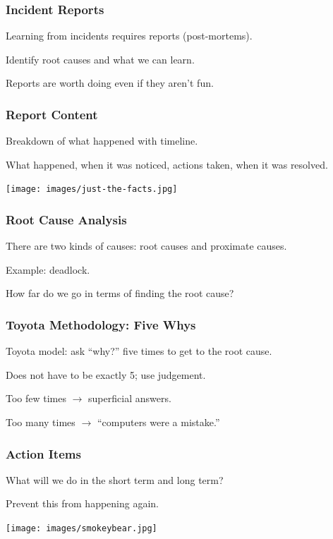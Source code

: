 \begin{frame}
\frametitle{Incident Reports}

Learning from incidents requires reports (post-mortems).

Identify root causes and what we can learn. 

Reports are worth doing even if they aren't fun.

\end{frame}


\begin{frame}
\frametitle{Report Content}

Breakdown of what happened with timeline.

What happened, when it was noticed, actions taken, when it was resolved.

\begin{center}
	\texttt{[image: images/just-the-facts.jpg]}
\end{center}


\end{frame}


\begin{frame}
\frametitle{Root Cause Analysis}

There are two kinds of causes: root causes and proximate causes.

Example: deadlock.

How far do we go in terms of finding the root cause?

\end{frame}


\begin{frame}
\frametitle{Toyota Methodology: Five Whys}

Toyota model: ask ``why?'' five times to get to the root cause.

Does not have to be exactly 5; use judgement.

Too few times $\rightarrow$ superficial answers.

Too many times $\rightarrow$ ``computers were a mistake.''

\end{frame}


\begin{frame}
\frametitle{Action Items}

What will we do in the short term and long term?

Prevent this from happening again.

\begin{center}
	\texttt{[image: images/smokeybear.jpg]}
\end{center}

\end{frame}



